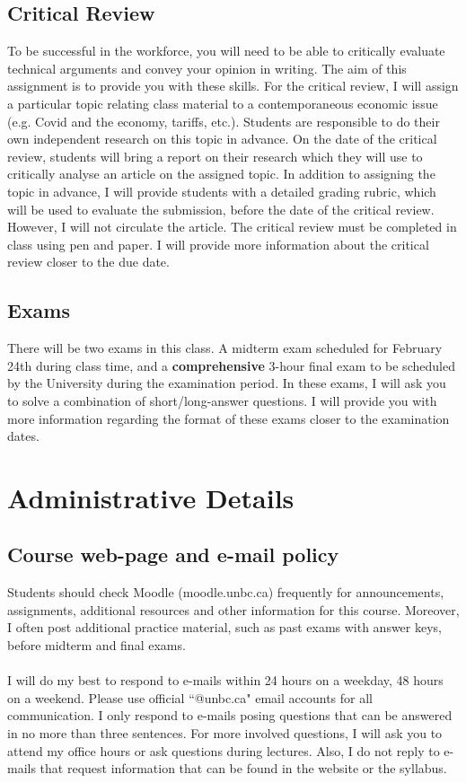 \documentclass[letterpaper,12pt]{article}
\theoremstyle{dotlessS}
\begin{document}
\subsection*{Critical Review}
To be successful in the workforce, you will need to be able to critically evaluate technical arguments and convey your opinion in writing. The aim of this assignment is to provide you with these skills. For the critical review, I will assign a particular topic relating class material to a contemporaneous economic issue (e.g. Covid and the economy, tariffs, etc.). Students are responsible to do their own independent research on this topic in advance. On the date of the critical review, students will bring a report on their research which they will use to critically analyse an article on the assigned topic. In addition to assigning the topic in advance, I will provide students with a detailed grading rubric, which will be used to evaluate the submission, before the date of the critical review. However, I will not circulate the article. The critical review must be completed in class using pen and paper. I will provide more information about the critical review closer to the due date.      
    
\subsection*{Exams}
There will be two exams in this class. A midterm exam scheduled for February 24th during class time, and a \textbf{comprehensive} 3-hour final exam to be scheduled by the University during the examination period. In these exams, I will ask you to solve a combination of short/long-answer questions. I will provide you with more information regarding the format of these exams closer to the examination dates.  

\section{Administrative Details}
\subsection*{Course web-page and e-mail policy}
Students should check Moodle (moodle.unbc.ca) frequently for announcements, assignments, additional resources and other information for this course.  Moreover, I often post additional practice material, such as past exams with answer keys, before midterm and final exams.\\
\\   
I will do my best to respond to e-mails within 24 hours on a weekday, 48 hours on a weekend. Please use official ``@unbc.ca" email accounts for all communication. I only respond to e-mails posing questions that can be answered in no more than three sentences. For more involved questions, I will ask you to attend my office hours or ask questions during lectures. Also, I do not reply to e-mails that request information that can be found in the website or the syllabus.
\end{document}
